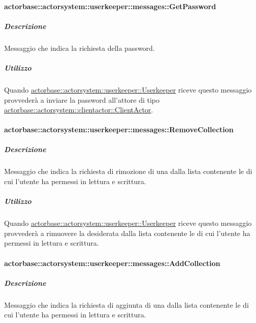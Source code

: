 \documentclass{scalatekids-article}
\begin{document}
\paragraph{actorbase::actorsystem::userkeeper::messages::GetPassword}
\label{sec:actorbase::actorsystem::userkeeper::messages::GetPassword}

\subparagraph{Descrizione}

Messaggio che indica la richiesta della password.

\subparagraph{Utilizzo}

Quando \hyperref[sec:actorbase::actorsystem::userkeeper::Userkeeper]{actorbase::\allowbreak{}actorsystem::\allowbreak{}userkeeper::\allowbreak{}Userkeeper}
riceve questo messaggio provvederà a inviare la password all'attore di tipo
\hyperref[sec:actorbase::actorsystem::clientactor::ClientActor]{actorbase::\allowbreak{}actorsystem::\allowbreak{}clientactor::\allowbreak{}ClientActor}.

\paragraph{actorbase::actorsystem::userkeeper::messages::RemoveCollection}
\label{sec:actorbase::actorsystem::userkeeper::messages::RemoveCollection}

\subparagraph{Descrizione}

Messaggio che indica la richiesta di rimozione di una  dalla
lista contenente le  di cui l'utente ha permessi in lettura
e scrittura.

\subparagraph{Utilizzo}

Quando \hyperref[sec:actorbase::actorsystem::userkeeper::Userkeeper]{actorbase::\allowbreak{}actorsystem::\allowbreak{}userkeeper::\allowbreak{}Userkeeper}
riceve questo messaggio provvederà a rimuovere la  desiderata
dalla lista contenente le  di cui l'utente ha permessi in
lettura e scrittura.

\paragraph{actorbase::actorsystem::userkeeper::messages::AddCollection}
\label{sec:actorbase::actorsystem::userkeeper::messages::AddCollection}

\subparagraph{Descrizione}

Messaggio che indica la richiesta di aggiunta di una  dalla
lista contenente le  di cui l'utente ha permessi in lettura
e scrittura.
\end{document}
